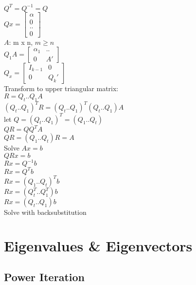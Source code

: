 \documentclass[8pt,letter]{article}
\begin{document}
\begin{multicols*}{2}
    $Q^T = Q^{-1} = Q$\\
    
    $Qx = \begin{bmatrix} \alpha \\ 0 \\ ..\\ 0 \end{bmatrix}$\\

    $A$: m x n, $m \geq n$\\
    
    $ Q_1 A =
    \begin{bmatrix}
      \alpha_1 & .. \\
      0 & A'
    \end{bmatrix}$\\

    $ Q_x =
    \begin{bmatrix}
      I_{k-1} & 0 \\
      0 & Q_k'
    \end{bmatrix}$\\    

    Transform to upper triangular matrix:\\
    $R = Q_t .. Q_1 A$\\
    $(Q_t .. Q_1)^T R = (Q_t .. Q_1)^T (Q_t .. Q_1) A$\\
    let $Q = (Q_t .. Q_1)^T = (Q_1 .. Q_t)$\\
    $Q R = Q Q^T A$\\
    $QR = (Q_1 .. Q_t) R = A$\\

    Solve $Ax=b$\\
    $QRx = b$\\
    $Rx = Q^{-1}b$\\
    $Rx = Q^T b$\\
    $Rx = (Q_1 .. Q_t)^T b$\\    
    $Rx = (Q_t^T .. Q_1^T) b$\\
    $Rx = (Q_t .. Q_1) b$\\
    Solve with backsubstitution\\

    \vfill\null
    \columnbreak
    
    \section{Eigenvalues & Eigenvectors}

    \subsection{Power Iteration}


\end{multicols*}
\end{document}
